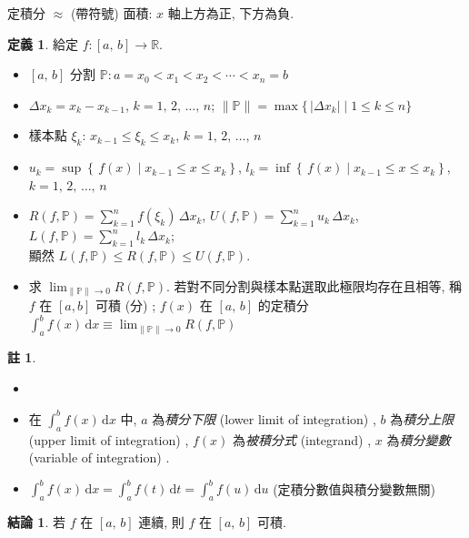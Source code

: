 \documentclass[12pt,a4paper]{extarticle}
\newcommand{\ds}{\displaystyle}
\theoremstyle{definition}
\newtheorem*{dfn}{定義}
\newtheorem*{fact}{結論}
\newtheorem*{rmk}{註}
\begin{document}
定積分 $\approx$  (帶符號) 面積: $x$ 軸上方為正, 下方為負. 

\begin{dfn}
  給定 $f:[a,\,b]\to\mathbb{R}$. 
  \begin{itemize}\setlength{\itemsep}{0pt}
    \item $[a,\,b]$ 分割 $\ds\mathbb{P}: a = x_0 < x_1 < x_2 < \cdots < x_n = b$
    \item $\ds\Delta x_k=x_k - x_{k-1}$, $k=1,\,2,\,\ldots,\,n$; $\ds\|\mathbb{P}\| = \max\{\,|\Delta x_k|\;|\;1\leqslant k\leqslant n\}$
    \item 樣本點 $\ds\xi_k$: $\ds x_{k-1} \leqslant \xi_k \leqslant x_k$, $k=1,\,2,\,\ldots,\,n$
    \item $\ds u_k = \sup\left\{\,f(x)\;|\;x_{k-1}\leqslant x\leqslant x_k\right\}$, $l_k = \inf\left\{\,f(x)\;|\;x_{k-1}\leqslant x\leqslant x_k\right\}$, $k=1,\,2,\,\ldots,\,n$
    \item $\ds R(f,\mathbb{P}) = \sum_{k=1}^n f(\xi_k)\,\Delta x_k$, $\ds U(f,\mathbb{P}) = \sum_{k=1}^n u_k\,\Delta x_k$, $\ds L(f,\mathbb{P}) = \sum_{k=1}^n l_k\,\Delta x_k$; \\顯然 $\ds L(f,\mathbb{P})\leqslant R(f,\mathbb{P})\leqslant U(f, \mathbb{P})$. 
    \item 求 $\ds\lim_{\|\mathbb{P}\|\to 0} R(f,\mathbb{P})$. 若對不同分割與樣本點選取此極限均存在且相等, 稱 $f$ 在 $[a, b]$ 可積 (分) ; $f(x)$ 在 $[a,\,b]$ 的定積分 $\ds\int_a^b f(x)\,\mathrm{d}x \equiv \lim_{\|\mathbb{P}\|\to 0} R(f,\mathbb{P})$
  \end{itemize}
\end{dfn}

\begin{rmk}
  \begin{itemize}\setlength{\itemsep}{0pt}
    \item[]
    \item 在 $\ds\int_a^b f(x)\,\text{d}x$ 中, $a$ 為\emph{積分下限} (lower limit of integration) , $b$ 為\emph{積分上限} (upper limit of integration) , $f(x)$ 為\emph{被積分式} (integrand) , $x$ 為\emph{積分變數} (variable of integration) . 
    \item $\ds\int_a^b f(x)\,\text{d}x = \int_a^b f(t)\,\text{d}t = \int_a^b f(u)\,\text{d}u$  (定積分數值與積分變數無關) 
  \end{itemize}
\end{rmk}

\begin{fact}
  若 $f$ 在 $[a,\,b]$ 連續, 則 $f$ 在 $[a,\,b]$ 可積. 
\end{fact}
\end{document}
